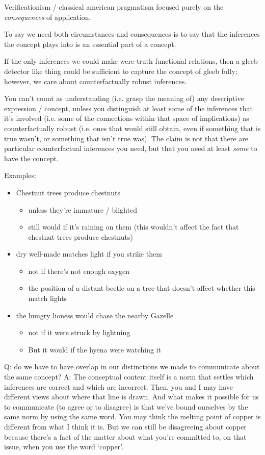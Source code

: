 Verificationism / classical american pragmatism focused purely on the \emph{consequences} of application.

To say we need both circumstances and consequences is to say that the inferences the concept plays into is an essential part of a concept.

If the only inferences we could make were truth functional relations, then a gleeb detector like thing could be sufficient to capture the concept of gleeb fully; however, we care about counterfactually robust inferences.

You can't count as understanding (i.e. grasp the meaning of) any descriptive expression / concept, unless you distinguish at least some of the inferences that it's involved (i.e. some of the connections within that space of implications) as counterfactually robust (i.e. ones that would still obtain, even if something that is true wasn't, or something that isn't true was). The claim is not that there are particular counterfactual inferences you need, but that you need at least \emph{some} to have the concept.

Examples:
\begin{itemize}
\item Chestnut trees produce chestnuts
\begin{itemize}
\item unless they're immature / blighted
\item still would if it's raining on them (this wouldn't affect the fact that chestnut trees produce chestnuts)
\end{itemize}
\item dry well-made matches light if you strike them
\begin{itemize}
\item not if there's not enough oxygen
\item the position of a distant beetle on a tree that doesn't affect whether this match lights
\end{itemize}
\item the hungry lioness would chase the nearby Gazelle
\begin{itemize}
\item not if it were struck by lightning
\item But it would if the hyena were watching it
\end{itemize}
\end{itemize}

Q: do we have to have overlap in our distinctions we made to communicate about the same concept?
A: The conceptual content itself is a norm that settles which inferences are correct and which are incorrect. Then, you and I may have different views about where that line is drawn. And what makes it possible for us to communicate (to agree or to disagree) is that we've bound ourselves by the same norm by using the same word. You may think the melting point of copper is different from what I think it is. But we can still be disagreeing about copper because there's a fact of the matter about what you're committed to, on that issue, when you use the word `copper'.

